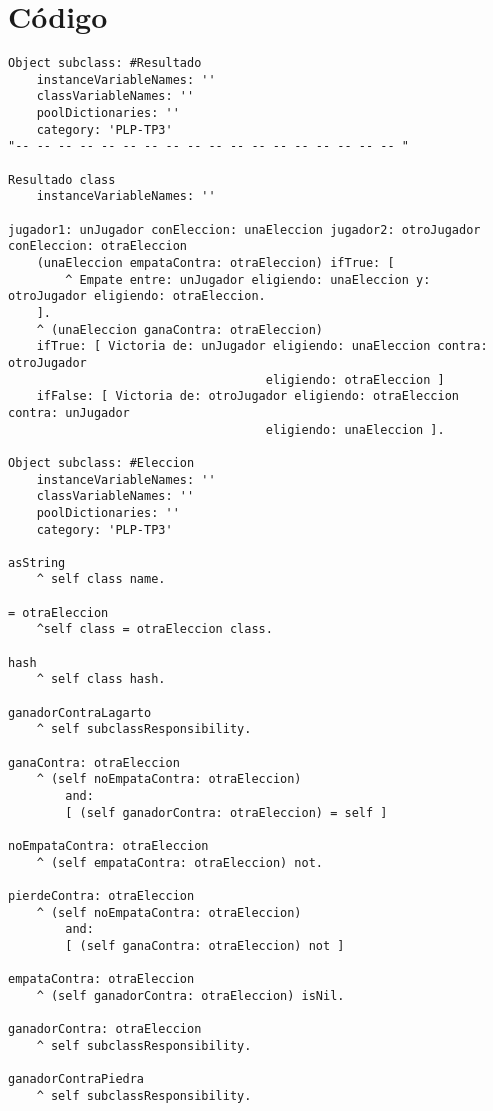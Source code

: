 \documentclass[10pt, a4paper,english,spanish,hidelinks]{article}
\begin{document}
\pagestyle{myheadings}
\maketitle
{}

\section{Código}


\begin{verbatim}
Object subclass: #Resultado
	instanceVariableNames: ''
	classVariableNames: ''
	poolDictionaries: ''
	category: 'PLP-TP3'
"-- -- -- -- -- -- -- -- -- -- -- -- -- -- -- -- -- -- "

Resultado class
	instanceVariableNames: ''

jugador1: unJugador conEleccion: unaEleccion jugador2: otroJugador conEleccion: otraEleccion 
	(unaEleccion empataContra: otraEleccion) ifTrue: [
		^ Empate entre: unJugador eligiendo: unaEleccion y: otroJugador eligiendo: otraEleccion.
	].
	^ (unaEleccion ganaContra: otraEleccion)
	ifTrue: [ Victoria de: unJugador eligiendo: unaEleccion contra: otroJugador 
									eligiendo: otraEleccion ]
	ifFalse: [ Victoria de: otroJugador eligiendo: otraEleccion contra: unJugador 
									eligiendo: unaEleccion ]. 

Object subclass: #Eleccion
	instanceVariableNames: ''
	classVariableNames: ''
	poolDictionaries: ''
	category: 'PLP-TP3'

asString
	^ self class name. 

= otraEleccion
	^self class = otraEleccion class. 

hash
	^ self class hash. 

ganadorContraLagarto
	^ self subclassResponsibility. 

ganaContra: otraEleccion
	^ (self noEmpataContra: otraEleccion)
	 	and:
		[ (self ganadorContra: otraEleccion) = self ] 

noEmpataContra: otraEleccion
	^ (self empataContra: otraEleccion) not. 

pierdeContra: otraEleccion
	^ (self noEmpataContra: otraEleccion)
		and:
		[ (self ganaContra: otraEleccion) not ] 

empataContra: otraEleccion
	^ (self ganadorContra: otraEleccion) isNil. 

ganadorContra: otraEleccion
	^ self subclassResponsibility. 

ganadorContraPiedra
	^ self subclassResponsibility. 


\end{verbatim}
\end{document}
